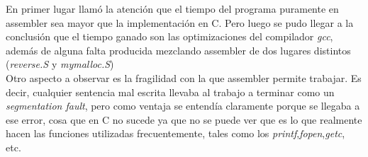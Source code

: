 \documentclass{article}
\begin{document}
En primer lugar llam\'o la atenci\'on que el tiempo del programa puramente en assembler sea mayor que la implementaci\'on en C. Pero luego se pudo llegar a la conclusi\'on que el tiempo ganado son las optimizaciones del compilador \textit{gcc}, adem\'as de alguna falta producida mezclando assembler de dos lugares distintos (\textit{reverse.S} y \textit{mymalloc.S})\\
Otro aspecto a observar es la fragilidad con la que assembler permite trabajar. Es decir, cualquier sentencia mal escrita llevaba al trabajo a terminar como un \textit{segmentation fault}, pero como ventaja se entend\'ia claramente porque se llegaba a ese error, cosa que en C no sucede ya que no se puede ver que es lo que realmente hacen las funciones utilizadas frecuentemente, tales como los \textit{printf},\textit{fopen},\textit{getc}, etc. 
\end{document}
